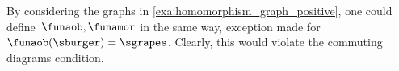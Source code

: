 \begin{example}[Counterexample]
	By considering the graphs in \cref{exa:homomorphism_graph_positive}, one could define~$\funaob,\funamor$ in the same way, exception made for~$\funaob(\sburger)=\sgrapes$.
	Clearly, this would violate the commuting diagrams condition.
\end{example}

\publictodomessage
{}
